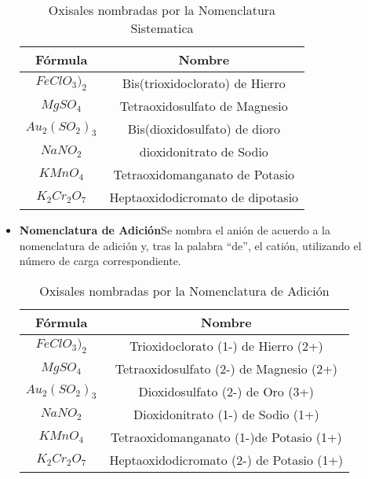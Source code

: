 \begin{itemize}
	\begin{table}[h!]
		\centering
		\begin{tabular}{c|c}
			Fórmula&Nombre \\ \hline
			$FeClO_3)_2$&Bis(trioxidoclorato) de Hierro\\
			$MgSO_4$&Tetraoxidosulfato de Magnesio\\
			$Au_2(SO_2)_3$&Bis(dioxidosulfato) de dioro\\
			$NaNO_2$&dioxidonitrato de Sodio\\
			$KMnO_4$&Tetraoxidomanganato de Potasio\\
			$K_2Cr_2O_7$&Heptaoxidodicromato de dipotasio\\ \hline
		\end{tabular}
		\caption{Oxisales nombradas por la Nomenclatura Sistematica}
	\end{table}
	\item\textbf{Nomenclatura de Adición}Se nombra el anión de acuerdo a la nomenclatura de adición y, tras la palabra “de”, el catión, utilizando el número de carga correspondiente.
	\begin{table}[h!]
		\centering
		\begin{tabular}{c|c}
			Fórmula&Nombre \\ \hline
			$FeClO_3)_2$&Trioxidoclorato (1-) de Hierro (2+)\\
			$MgSO_4$&Tetraoxidosulfato (2-) de Magnesio (2+)\\
			$Au_2(SO_2)_3$&Dioxidosulfato (2-) de Oro (3+)\\
			$NaNO_2$&Dioxidonitrato (1-) de Sodio (1+)\\
			$KMnO_4$&Tetraoxidomanganato (1-)de Potasio (1+)\\
			$K_2Cr_2O_7$&Heptaoxidodicromato (2-) de Potasio (1+)\\ \hline
		\end{tabular}
			\caption{Oxisales nombradas por la Nomenclatura de Adición}
	\end{table}
\end{itemize}
